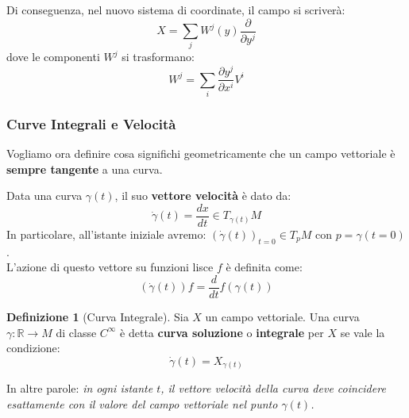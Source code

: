 \documentclass[openany]{book}
\theoremstyle{definition}
\newtheorem*{definizione}{Definizione}
\theoremstyle{remark}
\begin{document}
Di conseguenza, nel nuovo sistema di coordinate, il campo si scriverà:
\[
X = \sum_j W^j(y) \frac{\partial}{\partial y^j}
\]
dove le componenti $W^j$ si trasformano:
\begin{equation}
    W^j = \sum_i \frac{\partial y^j}{\partial x^i} V^i
\end{equation}

\subsubsection*{Curve Integrali e Velocità}

Vogliamo ora definire cosa significhi geometricamente che un campo vettoriale è \textbf{sempre tangente} a una curva.

\begin{center}
\end{center}
Data una curva $\gamma(t)$, il suo \textbf{vettore velocità} è dato da:
\[
\dot{\gamma}(t) = \frac{dx}{dt} \in T_{\gamma(t)}M
\]
In particolare, all'istante iniziale avremo: $(\dot{\gamma}(t))_{t=0} \in T_p M$ con $p = \gamma(t=0)$.
\\
L'azione di questo vettore su funzioni lisce $f$ è definita come:
\begin{equation}
    (\dot{\gamma}(t)) f = \frac{d}{dt} f(\gamma(t))
\end{equation}

\begin{definizione}[Curva Integrale]
    Sia $X$ un campo vettoriale. Una curva $\gamma: \mathbb{R} \to M$ di classe $C^\infty$ è detta \textbf{curva soluzione} o \textbf{integrale} per $X$ se vale la condizione:
    \begin{equation}
        \dot{\gamma}(t) = X_{\gamma(t)}
    \end{equation}
\end{definizione}
In altre parole: \textit{in ogni istante $t$, il vettore velocità della curva deve coincidere esattamente con il valore del campo vettoriale nel punto $\gamma(t)$.}
\end{document}
